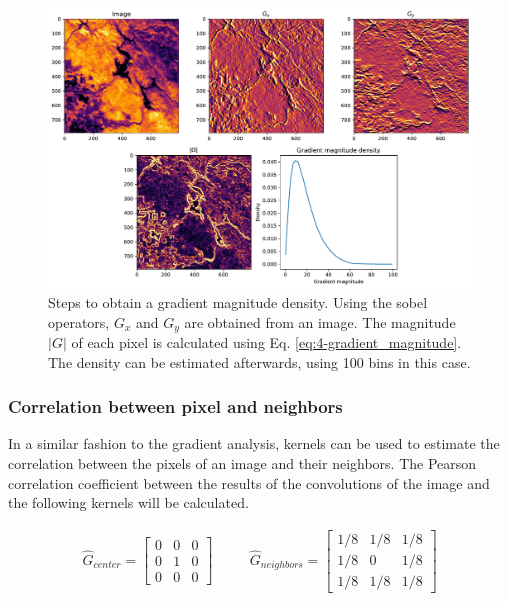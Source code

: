          \begin{figure}[H]
             \centering
             \includegraphics[width=\textwidth]{Includes/4-gradient-analysis.pdf}
             \caption{Steps to obtain a gradient magnitude density. Using the sobel operators, $G_x$ and $G_y$ are obtained from an image. The magnitude $|G|$ of each pixel is calculated using Eq. \ref{eq:4-gradient_magnitude}. The density can be estimated afterwards, using 100 bins in this case.}
             \label{fig:4-gradient-analysis}
         \end{figure}


      \subsubsection{Correlation between pixel and neighbors }


        In a similar fashion to the gradient analysis, kernels can be used to estimate the correlation between the pixels of an image and their neighbors. The Pearson correlation coefficient between the results of the convolutions of the image and the following kernels will be calculated.
        
        \begin{equation}
            \begin{array}{ccc}
            \hat{G}_{center} = \begin{bmatrix}
            0 & 0 & 0 \\
            0 & 1 & 0 \\
            0 & 0 & 0
            \end{bmatrix}
            &
            \quad
            &
            \hat{G}_{neighbors} = \begin{bmatrix}
             1/8 &  1/8 & 1/8 \\
             1/8 &  0 & 1/8 \\
            1/8 & 1/8 & 1/8
            \end{bmatrix}
            \end{array}
            \label{eq:4-sobel-operators}
        \end{equation}
    
